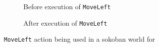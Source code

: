\documentclass[\master/Master.tex]{subfiles}
\begin{document}
\begin{figure}
    \hspace*{0.1\textwidth}%
    \begin{subfigure}{0.35\textwidth}
        \centering
        \resizebox{\linewidth}{!}{}
        \caption{Before execution of \texttt{MoveLeft}}
    \end{subfigure}%
    \hspace*{0.1\textwidth}%
    \begin{subfigure}{0.35\textwidth}
        \centering
        \resizebox{\linewidth}{!}{}
        \caption{After execution of \texttt{MoveLeft}}
    \end{subfigure}
    \hspace*{0.1\textwidth}
	\caption{\label{fig:ca:sokoban-moveleft-action}\texttt{MoveLeft} action being used in a sokoban world for  }

\end{figure}
\end{document}
